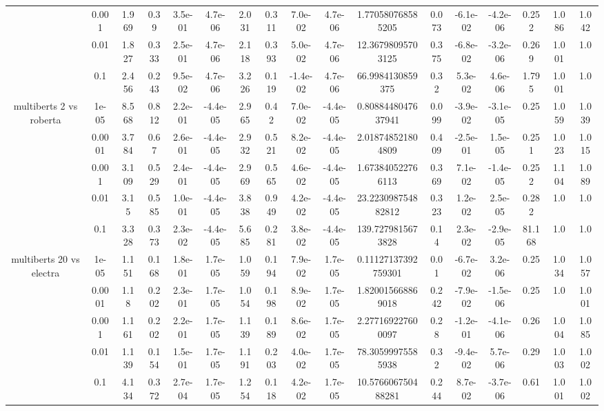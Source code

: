 \begin{tabular}{|c|c|c|c|c|c|c|c|c|c|c|c|c|c|c|c|c|}
 & 0.001 & 1.969 & 0.39 & 3.5e-01 & 4.7e-06 & 2.031 & 0.311 & 7.0e-02 & 4.7e-06 & 1.770580768585205 & 0.073 & -6.1e-02 & -4.2e-06 & 0.252 & 1.086 & 1.042 \\
 & 0.01 & 1.827 & 0.333 & 2.5e-01 & 4.7e-06 & 2.118 & 0.393 & 5.0e-02 & 4.7e-06 & 12.36798095703125 & 0.375 & -6.8e-02 & -3.2e-06 & 0.269 & 1.001 & 1.0 \\
 & 0.1 & 2.456 & 0.243 & 9.5e-02 & 4.7e-06 & 3.226 & 0.119 & -1.4e-02 & 4.7e-06 & 66.9984130859375 & 0.32 & 5.3e-02 & 4.6e-06 & 1.795 & 1.001 & 1.0 \\
\hline
\multirow{5}{*}{multiberts 2 vs roberta } & 1e-05 & 8.568 & 0.812 & 2.2e-01 & -4.4e-05 & 2.965 & 0.42 & 7.0e-02 & -4.4e-05 & 0.8088448047637941 & 0.099 & -3.9e-02 & -3.1e-05 & 0.25 & 1.059 & 1.039 \\
 & 0.0001 & 3.784 & 0.67 & 2.6e-01 & -4.4e-05 & 2.932 & 0.521 & 8.2e-02 & -4.4e-05 & 2.018748521804809 & 0.409 & -2.5e-01 & 1.5e-05 & 0.251 & 1.023 & 1.015 \\
 & 0.001 & 3.109 & 0.529 & 2.4e-01 & -4.4e-05 & 2.969 & 0.565 & 4.6e-02 & -4.4e-05 & 1.673840522766113 & 0.369 & 7.1e-02 & -1.4e-05 & 0.252 & 1.104 & 1.089 \\
 & 0.01 & 3.15 & 0.585 & 1.0e-01 & -4.4e-05 & 3.838 & 0.949 & 4.2e-02 & -4.4e-05 & 23.223098754882812 & 0.323 & 1.2e-02 & 2.5e-05 & 0.282 & 1.0 & 1.0 \\
 & 0.1 & 3.328 & 0.373 & 2.3e-02 & -4.4e-05 & 5.685 & 0.281 & 3.8e-02 & -4.4e-05 & 139.7279815673828 & 0.14 & 2.3e-02 & -2.9e-05 & 81.168 & 1.0 & 1.0 \\
\hline
\multirow{5}{*}{multiberts 20 vs electra } & 1e-05 & 1.151 & 0.168 & 1.8e-01 & 1.7e-05 & 1.059 & 0.194 & 7.9e-02 & 1.7e-05 & 0.11127137392759301 & 0.01 & -6.7e-02 & 3.2e-06 & 0.25 & 1.034 & 1.057 \\
 & 0.0001 & 1.18 & 0.202 & 2.3e-01 & 1.7e-05 & 1.054 & 0.198 & 8.9e-02 & 1.7e-05 & 1.820015668869018 & 0.242 & -7.9e-02 & -1.5e-06 & 0.25 & 1.0 & 1.001 \\
 & 0.001 & 1.161 & 0.202 & 2.2e-01 & 1.7e-05 & 1.139 & 0.189 & 8.6e-02 & 1.7e-05 & 2.277169227600097 & 0.28 & -1.2e-01 & -4.1e-06 & 0.26 & 1.004 & 1.085 \\
 & 0.01 & 1.139 & 0.154 & 1.5e-01 & 1.7e-05 & 1.191 & 0.203 & 4.0e-02 & 1.7e-05 & 78.30599975585938 & 0.32 & -9.4e-02 & 5.7e-06 & 0.29 & 1.003 & 1.002 \\
 & 0.1 & 4.134 & 0.372 & 2.7e-04 & 1.7e-05 & 1.254 & 0.118 & 4.2e-02 & 1.7e-05 & 10.576606750488281 & 0.244 & 8.7e-02 & -3.7e-06 & 0.61 & 1.001 & 1.002 \\

\end{tabular}
